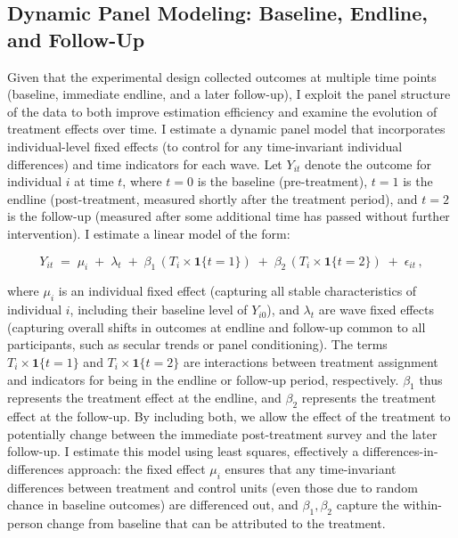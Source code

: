 \documentclass[12pt, american]{article}
\begin{document}
\subsection{Dynamic Panel Modeling: Baseline, Endline, and Follow-Up}
Given that the experimental design collected outcomes at multiple time points (baseline, immediate endline, and a later follow-up), I exploit the panel structure of the data to both improve estimation efficiency and examine the evolution of treatment effects over time. I estimate a dynamic panel model that incorporates individual-level fixed effects (to control for any time-invariant individual differences) and time indicators for each wave. Let $Y_{it}$ denote the outcome for individual $i$ at time $t$, where $t=0$ is the baseline (pre-treatment), $t=1$ is the endline (post-treatment, measured shortly after the treatment period), and $t=2$ is the follow-up (measured after some additional time has passed without further intervention). I estimate a linear model of the form:

\begin{equation}\label{eq:panel}
Y_{it} \;=\; \mu_i \;+\; \lambda_t \;+\; \beta_1\,(T_i \times \mathbf{1}\{t=1\}) \;+\; \beta_2\,(T_i \times \mathbf{1}\{t=2\}) \;+\; \epsilon_{it}\,,
\end{equation}

where $\mu_i$ is an individual fixed effect (capturing all stable characteristics of individual $i$, including their baseline level of $Y_{i0}$), and $\lambda_t$ are wave fixed effects (capturing overall shifts in outcomes at endline and follow-up common to all participants, such as secular trends or panel conditioning). The terms $T_i \times \mathbf{1}\{t=1\}$ and $T_i \times \mathbf{1}\{t=2\}$ are interactions between treatment assignment and indicators for being in the endline or follow-up period, respectively. $\beta_1$ thus represents the treatment effect at the endline, and $\beta_2$ represents the treatment effect at the follow-up. By including both, we allow the effect of the treatment to potentially change between the immediate post-treatment survey and the later follow-up. I estimate this model using least squares, effectively a differences-in-differences approach: the fixed effect $\mu_i$ ensures that any time-invariant differences between treatment and control units (even those due to random chance in baseline outcomes) are differenced out, and $\beta_1, \beta_2$ capture the within-person change from baseline that can be attributed to the treatment.
\end{document}
